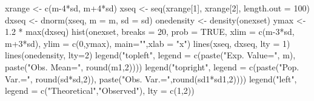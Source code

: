 \begin{Schunk}
\begin{Sinput}
  xrange <- c(m-4*sd, m+4*sd)
  xseq <- seq(xrange[1], xrange[2], length.out = 100)
  dxseq <- dnorm(xseq, m = m, sd = sd)
  onedensity <- density(onexset)
  ymax <- 1.2 * max(dxseq)
  hist(onexset, breaks = 20, prob = TRUE, xlim = c(m-3*sd, m+3*sd), ylim = c(0,ymax),   main="",xlab = "x")
  lines(xseq, dxseq, lty = 1)
  lines(onedensity, lty=2)
  legend("topleft", legend = c(paste("Exp. Value=", m), paste("Obs. Mean=", round(m1,2))))
  legend("topright", legend = c(paste("Pop. Var.=", round(sd*sd,2)), paste("Obs. Var.=",round(sd1*sd1,2))))
  legend("left", legend = c("Theoretical","Observed"), lty = c(1,2))
\end{Sinput}
\end{Schunk}
